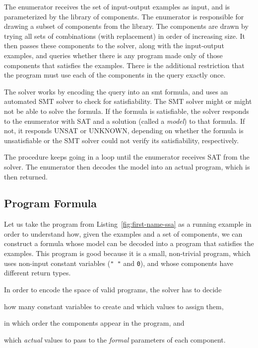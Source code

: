 The enumerator receives the set of input-output examples as input, and is
parameterized by the library of components. The enumerator is responsible for
drawing a subset of components from the library. The components are drawn by
trying all sets of combinations (with replacement) in order of increasing size.
It then passes these components to the solver, along with the input-output
examples, and queries whether there is any program made only of those components
that satisfies the examples. There is the additional restriction that the
program must use each of the components in the query exactly once.

The solver works by encoding the query into an \gls{smt} formula, and uses an
automated SMT solver to check for satisfiability. The SMT solver might or might
not be able to solve the formula. If the formula is satisfiable, the solver
responds to the enumerator with SAT and a solution (called a \textit{model}) to
that formula. If not, it responds UNSAT or UNKNOWN, depending on whether the
formula is unsatisfiable or the SMT solver could not verify its satisfiability,
respectively.

The procedure keeps going in a loop until the enumerator receives SAT from the
solver. The enumerator then decodes the model into an actual program, which is
then returned.

\subsection{Program Formula}
\label{sec:program-formula}

Let us take the program from Listing~\ref{fig:first-name-ssa} as a running
example in order to understand how, given the examples and a set of components,
we can construct a formula whose model can be decoded into a program that
satisfies the examples. This program is good because it is a small, non-trivial
program, which uses non-input constant variables (\lstinline{" "} and
\lstinline{0}), and whose components have different return types.

In order to encode the space of valid programs, the solver has to decide
\begin{enumerate*}[(1)]
\item how many constant variables to create and which values to assign them,
\item in which order the components appear in the program, and
\item which \textit{actual} values to pass to the \textit{formal} parameters of
  each component.
\end{enumerate*}

